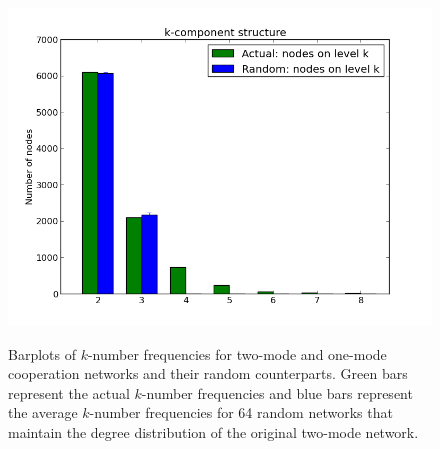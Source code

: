 \begin{figure}[p]
{\includegraphics[scale=0.34]{figures/barplot_nucl_th_2mode}
}
\hspace{.05in}
\caption[Barplots of $k$-number frequencies.]{Barplots of $k$-number frequencies for two-mode and one-mode cooperation networks and their random counterparts. Green bars represent the actual $k$-number frequencies and blue bars represent the average $k$-number frequencies for 64 random networks that maintain the degree distribution of the original two-mode network.} 
\label{fig:sc}
\end{figure}

